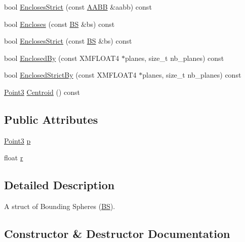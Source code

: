 \begin{DoxyCompactItemize}
\item 
bool \hyperlink{structmage_1_1_b_s_a2114f30ef1fd41b0fdeab31c24a66b7a}{Encloses\+Strict} (const \hyperlink{structmage_1_1_a_a_b_b}{A\+A\+BB} \&aabb) const
\item 
bool \hyperlink{structmage_1_1_b_s_a60a9ed7cca1ffb815c43eafa7f5093b6}{Encloses} (const \hyperlink{structmage_1_1_b_s}{BS} \&bs) const
\item 
bool \hyperlink{structmage_1_1_b_s_ad1b81567c640283bd5355073dd0bf226}{Encloses\+Strict} (const \hyperlink{structmage_1_1_b_s}{BS} \&bs) const
\item 
bool \hyperlink{structmage_1_1_b_s_afa01cd31b15b2decdf5a3c5333e4c260}{Enclosed\+By} (const X\+M\+F\+L\+O\+A\+T4 $\ast$planes, size\+\_\+t nb\+\_\+planes) const
\item 
bool \hyperlink{structmage_1_1_b_s_ae4355ffb0d3f5109ad6ee2bea00a6eb9}{Enclosed\+Strict\+By} (const X\+M\+F\+L\+O\+A\+T4 $\ast$planes, size\+\_\+t nb\+\_\+planes) const
\item 
\hyperlink{structmage_1_1_point3}{Point3} \hyperlink{structmage_1_1_b_s_a0709a2c2d2a175da0d6e53eda480fce1}{Centroid} () const
\end{DoxyCompactItemize}
\subsection*{Public Attributes}
\begin{DoxyCompactItemize}
\item 
\hyperlink{structmage_1_1_point3}{Point3} \hyperlink{structmage_1_1_b_s_a9c6ad8f37fa6b98179e8108c8584fdcf}{p}
\item 
float \hyperlink{structmage_1_1_b_s_ab2e786e8493feb28a3bc0216e8dea5bc}{r}
\end{DoxyCompactItemize}


\subsection{Detailed Description}
A struct of Bounding Spheres (\hyperlink{structmage_1_1_b_s}{BS}). 

\subsection{Constructor \& Destructor Documentation}
\hypertarget{structmage_1_1_b_s_aa34921d9ea23b9a724ddf739b3adabfa}{}\label{structmage_1_1_b_s_aa34921d9ea23b9a724ddf739b3adabfa} 
